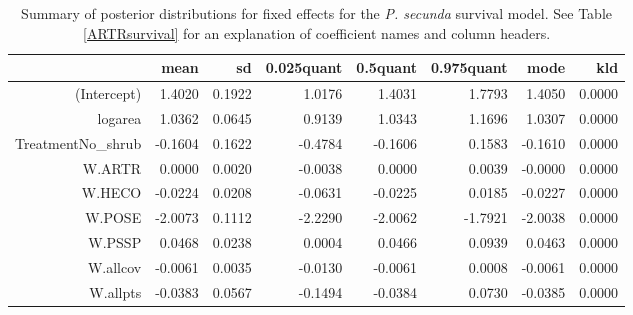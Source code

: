 \documentclass[11pt]{article}
\begin{document}
\begin{table}[ht]
\centering
\caption{Summary of posterior distributions for fixed effects for the \textit{P. secunda} survival model. See Table \ref{ARTRsurvival} for an explanation of coefficient names
and column headers.} 
\label{POSEsurvival}
\begin{tabular}{rrrrrrrr}
  \hline
 & mean & sd & 0.025quant & 0.5quant & 0.975quant & mode & kld \\ 
  \hline
(Intercept) & 1.4020 & 0.1922 & 1.0176 & 1.4031 & 1.7793 & 1.4050 & 0.0000 \\ 
  logarea & 1.0362 & 0.0645 & 0.9139 & 1.0343 & 1.1696 & 1.0307 & 0.0000 \\ 
  TreatmentNo\_shrub & -0.1604 & 0.1622 & -0.4784 & -0.1606 & 0.1583 & -0.1610 & 0.0000 \\ 
  W.ARTR & 0.0000 & 0.0020 & -0.0038 & 0.0000 & 0.0039 & -0.0000 & 0.0000 \\ 
  W.HECO & -0.0224 & 0.0208 & -0.0631 & -0.0225 & 0.0185 & -0.0227 & 0.0000 \\ 
  W.POSE & -2.0073 & 0.1112 & -2.2290 & -2.0062 & -1.7921 & -2.0038 & 0.0000 \\ 
  W.PSSP & 0.0468 & 0.0238 & 0.0004 & 0.0466 & 0.0939 & 0.0463 & 0.0000 \\ 
  W.allcov & -0.0061 & 0.0035 & -0.0130 & -0.0061 & 0.0008 & -0.0061 & 0.0000 \\ 
  W.allpts & -0.0383 & 0.0567 & -0.1494 & -0.0384 & 0.0730 & -0.0385 & 0.0000 \\ 
   \hline
\end{tabular}
\end{table}
\end{document}
